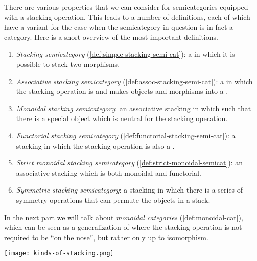 There are various properties that we can consider for semicategories equipped with a stacking operation. This leads to a number of definitions, each of which have a variant for the case when the semicategory in question is in fact a category. 
Here is a short overview of the most important definitions. 
%
\begin{enumerate}
    \item \emph{Stacking semicategory} (\cref{def:simple-stacking-semi-cat}): a  in which it is possible to stack two morphisms.
    \item \emph{Associative stacking semicategory} (\cref{def:assoc-stacking-semi-cat}): a  in which the stacking operation is  and makes objects and morphisms into a .
    \item \emph{Monoidal stacking semicategory}: an associative stacking  in which such that there is a special object which is neutral for the stacking operation.
        \item \emph{Functorial stacking semicategory} (\cref{def:functorial-stacking-semi-cat}): a stacking  in which the stacking operation is also a .
     \item \emph{Strict monoidal stacking semicategory} (\cref{def:strict-monoidal-semicat}): an associative stacking  which is both monoidal and functorial.
    \item \emph{Symmetric stacking semicategory}: a stacking  in which there is a series of symmetry operations that can permute the objects in a stack.
\end{enumerate}
%
In the next part we will talk about \emph{monoidal categories} (\cref{def:monoidal-cat}), which can be seen as a generalization of   where the stacking operation is not required to be  ``on the nose'', but rather only up to isomorphism.


\begin{center}
\texttt{[image: kinds-of-stacking.png]}
\end{center}

